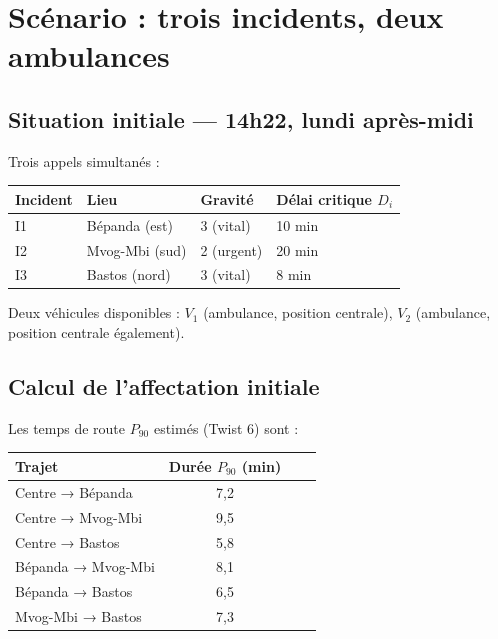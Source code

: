 \documentclass[12pt,a4paper]{article}
\theoremstyle{definition}
\theoremstyle{remark}
\begin{document}
\newpage

\section{Scénario : trois incidents, deux ambulances}

\subsection{Situation initiale — 14h22, lundi après-midi}

Trois appels simultanés :

\begin{center}
\begin{tabular}{llll}
  \toprule
  \textbf{Incident} & \textbf{Lieu} & \textbf{Gravité} & \textbf{Délai critique $D_i$} \\
  \midrule
  I1 & Bépanda (est)   & 3 (vital) & 10 min \\
  I2 & Mvog-Mbi (sud)  & 2 (urgent) & 20 min \\
  I3 & Bastos (nord)   & 3 (vital) & 8 min \\
  \bottomrule
\end{tabular}
\end{center}

Deux véhicules disponibles : $V_1$ (ambulance, position centrale),
$V_2$ (ambulance, position centrale également).

\subsection{Calcul de l’affectation initiale}

Les temps de route $P_{90}$ estimés (Twist 6) sont :

\begin{center}
\begin{tabular}{lccc}
  \toprule
  \textbf{Trajet} & \textbf{Durée $P_{90}$ (min)} \\
  \midrule
  Centre → Bépanda & 7,2 \\
  Centre → Mvog-Mbi & 9,5 \\
  Centre → Bastos & 5,8 \\
  Bépanda → Mvog-Mbi & 8,1 \\
  Bépanda → Bastos & 6,5 \\
  Mvog-Mbi → Bastos & 7,3 \\
  \bottomrule
\end{tabular}
\end{center}
\end{document}
